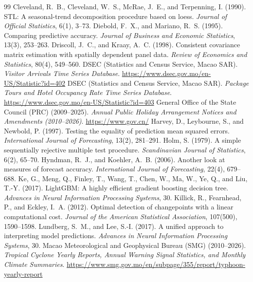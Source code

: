 \documentclass[11pt,a4paper]{article}
\begin{document}
\clearpage
{\small\singlespacing
\begin{thebibliography}{99}
\setlength{\itemsep}{3pt}
 Cleveland, R.~B., Cleveland, W.~S., McRae, J.~E., and Terpenning, I. (1990). STL: A seasonal-trend decomposition procedure based on loess. \textit{Journal of Official Statistics}, 6(1), 3--73.
 Diebold, F.~X., and Mariano, R.~S. (1995). Comparing predictive accuracy. \textit{Journal of Business and Economic Statistics}, 13(3), 253--263.
 Driscoll, J.~C., and Kraay, A.~C. (1998). Consistent covariance matrix estimation with spatially dependent panel data. \textit{Review of Economics and Statistics}, 80(4), 549--560.
 DSEC (Statistics and Census Service, Macao SAR). \textit{Visitor Arrivals Time Series Database}. \url{https://www.dsec.gov.mo/en-US/Statistic?id=402}
 DSEC (Statistics and Census Service, Macao SAR). \textit{Package Tours and Hotel Occupancy Rate Time Series Database}. \url{https://www.dsec.gov.mo/en-US/Statistic?id=403}
 General Office of the State Council (PRC) (2009--2025). \textit{Annual Public Holiday Arrangement Notices and Amendments (2010--2026)}. \url{https://www.gov.cn/}
 Harvey, D., Leybourne, S., and Newbold, P. (1997). Testing the equality of prediction mean squared errors. \textit{International Journal of Forecasting}, 13(2), 281--291.
 Holm, S. (1979). A simple sequentially rejective multiple test procedure. \textit{Scandinavian Journal of Statistics}, 6(2), 65--70.
 Hyndman, R.~J., and Koehler, A.~B. (2006). Another look at measures of forecast accuracy. \textit{International Journal of Forecasting}, 22(4), 679--688.
 Ke, G., Meng, Q., Finley, T., Wang, T., Chen, W., Ma, W., Ye, Q., and Liu, T.-Y. (2017). LightGBM: A highly efficient gradient boosting decision tree. \textit{Advances in Neural Information Processing Systems}, 30.
 Killick, R., Fearnhead, P., and Eckley, I.~A. (2012). Optimal detection of changepoints with a linear computational cost. \textit{Journal of the American Statistical Association}, 107(500), 1590--1598.
 Lundberg, S.~M., and Lee, S.-I. (2017). A unified approach to interpreting model predictions. \textit{Advances in Neural Information Processing Systems}, 30.
 Macao Meteorological and Geophysical Bureau (SMG) (2010--2026). \textit{Tropical Cyclone Yearly Reports, Annual Warning Signal Statistics, and Monthly Climate Summaries}. \url{https://www.smg.gov.mo/en/subpage/355/report/typhoon-yearly-report}
\end{thebibliography}
}
\end{document}
